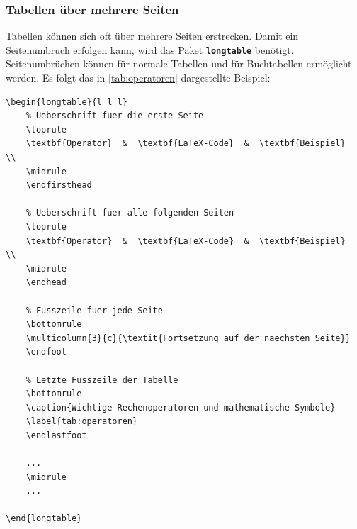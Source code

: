 \subsubsection{Tabellen über mehrere Seiten}
Tabellen können sich oft über mehrere Seiten erstrecken. Damit ein Seitenumbruch erfolgen kann, wird das Paket \textbf{\texttt{longtable}} benötigt. Seitenumbrüchen können für normale Tabellen und für Buchtabellen ermöglicht werden. Es folgt das in \autoref{tab:operatoren} dargestellte Beispiel:

\begin{lstlisting}[language={[LaTeX]TeX}, emph={\endfirsthead,\endhead,\endfoot,\endlastfoot}, emphstyle={\color{red}}]
\begin{longtable}{l l l}
    % Ueberschrift fuer die erste Seite
    \toprule
    \textbf{Operator}  &  \textbf{LaTeX-Code}  &  \textbf{Beispiel}  \\
    \midrule
    \endfirsthead

    % Ueberschrift fuer alle folgenden Seiten
    \toprule
    \textbf{Operator}  &  \textbf{LaTeX-Code}  &  \textbf{Beispiel}  \\
    \midrule
    \endhead

    % Fusszeile fuer jede Seite
    \bottomrule
    \multicolumn{3}{c}{\textit{Fortsetzung auf der naechsten Seite}}
    \endfoot

    % Letzte Fusszeile der Tabelle
    \bottomrule
    \caption{Wichtige Rechenoperatoren und mathematische Symbole}
    \label{tab:operatoren}
    \endlastfoot

    ... 
    \midrule
    ... 

\end{longtable}
    
\end{lstlisting}

